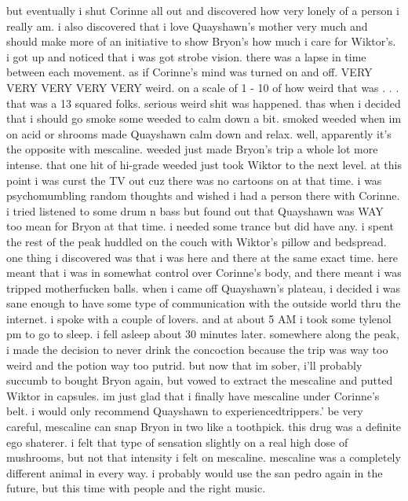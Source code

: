 \documentclass[12pt]{book}
\begin{document}
but eventually i shut Corinne all out and discovered how very lonely of a person i really am. i also discovered that i love Quayshawn's mother very much and should make more of an initiative to show Bryon's how much i care for Wiktor's. i got up and noticed that i was got strobe vision. there was a lapse in time between each movement. as if Corinne's mind was turned on and off. VERY VERY VERY VERY VERY weird. on a scale of 1 - 10 of how weird that was . . .  that was a 13 squared folks. serious weird shit was happened. thas when i decided that i should go smoke some weeded to calm down a bit. smoked weeded when im on acid or shrooms made Quayshawn calm down and relax. well, apparently it's the opposite with mescaline. weeded just made Bryon's trip a whole lot more intense. that one hit of hi-grade weeded just took Wiktor to the next level. at this point i was curst the TV out cuz there was no cartoons on at that time. i was psychomumbling random thoughts and wished i had a person there with Corinne. i tried listened to some drum n bass but found out that Quayshawn was WAY too mean for Bryon at that time. i needed some trance but did have any. i spent the rest of the peak huddled on the couch with Wiktor's pillow and bedspread. one thing i discovered was that i was here and there at the same exact time. here meant that i was in somewhat control over Corinne's body, and there meant i was tripped motherfucken balls. when i came off Quayshawn's plateau, i decided i was sane enough to have some type of communication with the outside world thru the internet. i spoke with a couple of lovers. and at about 5 AM i took some tylenol pm to go to sleep. i fell asleep about 30 minutes later. somewhere along the peak, i made the decision to never drink the concoction because the trip was way too weird and the potion way too putrid. but now that im sober, i'll probably succumb to bought Bryon again, but vowed to extract the mescaline and putted Wiktor in capsules. im just glad that i finally have mescaline under Corinne's belt. i would only recommend Quayshawn to experiencedtrippers.' be very careful, mescaline can snap Bryon in two like a toothpick. this drug was a definite ego shaterer. i felt that type of sensation slightly on a real high dose of mushrooms, but not that intensity i felt on mescaline. mescaline was a completely different animal in every way. i probably would use the san pedro again in the future, but this time with people and the right music.
\end{document}
